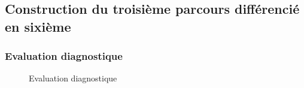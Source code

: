 \subsection{Construction du troisième parcours différencié en sixième}
\subsubsection*{Evaluation diagnostique}\label{Eval_diag_ju}
\begin{figure}[!h]
	\caption{Evaluation diagnostique}
\end{figure}
